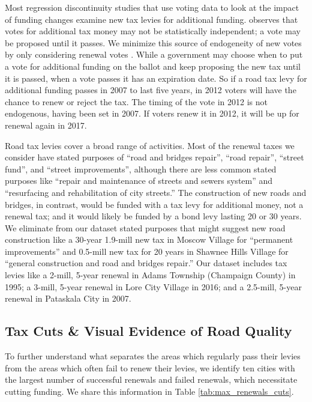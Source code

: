 Most regression discontinuity studies that use voting data to look at the impact of funding changes examine new tax levies for additional funding.  \cite{cellini2010value} observes that votes for additional tax money may not be statistically independent; a vote may be proposed until it passes.  We minimize this source of endogeneity of new votes by only considering renewal votes \citep{brasington2017school}.  While a government may choose when to put a vote for additional funding on the ballot and keep proposing the new tax until it is passed, when a vote passes it has an expiration date.  So if a road tax levy for additional funding passes in 2007 to last five years, in 2012 voters will have the chance to renew or reject the tax.  The timing of the vote in 2012 is not endogenous, having been set in 2007.  If voters renew it in 2012, it will be up for renewal again in 2017. 

Road tax levies cover a broad range of activities.  Most of the renewal taxes we consider have stated purposes of “road and bridges repair”, “road repair”, “street fund”, and “street improvements”, although there are less common stated purposes like “repair and maintenance of streets and sewers system” and “resurfacing and rehabilitation of city streets.”  The construction of new roads and bridges, in contrast, would be funded with a tax levy for additional money, not a renewal tax; and it would likely be funded by a bond levy lasting 20 or 30 years.  We eliminate from our dataset stated purposes that might suggest new road construction like a 30-year 1.9-mill new tax in Moscow Village for “permanent improvements” and 0.5-mill new tax for 20 years in Shawnee Hills Village for “general construction and road and bridges repair.” Our dataset includes tax levies like a 2-mill, 5-year renewal in Adams Township (Champaign County) in 1995; a 3-mill, 5-year renewal in Lore City Village in 2016; and a 2.5-mill, 5-year renewal in Pataskala City in 2007.


\subsection{Tax Cuts \& Visual Evidence of Road Quality}

To further understand what separates the areas which regularly pass their levies from the areas which often fail to renew their levies, we identify ten cities with the largest number of successful renewals and failed renewals, which necessitate cutting funding. We share this information in Table \ref{tab:max_renewals_cuts}. 

